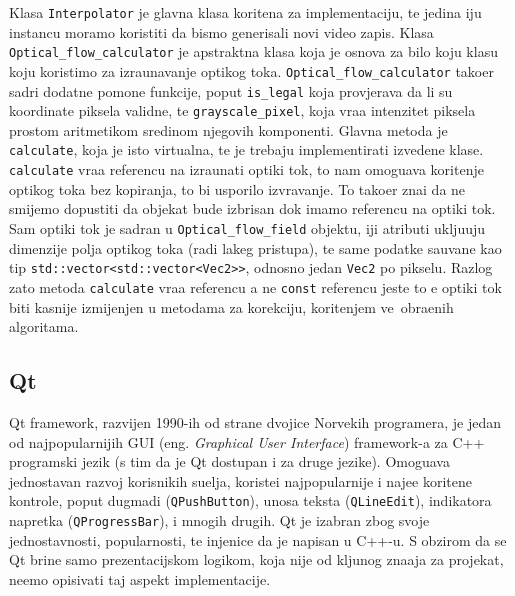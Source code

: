 Klasa \lstinline{Interpolator} je glavna klasa kori\sh tena za implementaciju, te jedina \ch iju instancu moramo koristiti da bismo generisali novi video zapis. Klasa \lstinline{Optical_flow_calculator}
je apstraktna klasa koja je osnova za bilo koju klasu koju koristimo za izra\ch unavanje opti\ch kog toka. \lstinline{Optical_flow_calculator} tako\dj er sadr\zh i dodatne pomo\cj ne funkcije, poput
\lstinline{is_legal} koja provjerava da li su koordinate piksela validne, te \lstinline{grayscale_pixel}, koja vra\cj a intenzitet piksela prostom aritmeti\ch kom sredinom njegovih komponenti.
Glavna metoda je \lstinline{calculate}, koja je \ch isto virtualna, te je trebaju implementirati izvedene klase. \lstinline{calculate} vra\cj a referencu na izra\ch unati opti\ch ki tok, \sh to nam omogu\cj ava
kori\sh tenje opti\ch kog toka bez kopiranja, \sh to bi usporilo izvr\sh avanje. To tako\dj er zna\ch i da ne smijemo dopustiti da objekat bude izbrisan dok imamo referencu na opti\ch ki tok.
Sam opti\ch ki tok je sadr\zh an u \lstinline{Optical_flow_field} objektu, \ch iji atributi uklju\ch uju dimenzije polja opti\ch kog toka (radi lak\sh eg pristupa), te same podatke sa\ch uvane kao tip
\lstinline{std::vector<std::vector<Vec2>>}, odnosno jedan \lstinline{Vec2} po pikselu. Razlog za\sh to metoda \lstinline{calculate} vra\cj a referencu a ne \lstinline{const} referencu jeste \sh to \cj e
opti\ch ki tok biti kasnije izmijenjen u metodama za korekciju, kori\sh tenjem ve\cj\ obra\dj enih algoritama.

\subsection{Qt} %
Qt framework, razvijen 1990-ih od strane dvojice Norve\sh kih programera, je jedan od najpopularnijih GUI (eng. \textit{Graphical User Interface}) framework-a za C++ programski jezik (s tim da je
Qt dostupan i za druge jezike). Omogu\cj ava jednostavan razvoj korisni\ch kih su\ch elja, koriste\cj i najpopularnije i naj\ch e\sh \cj e kori\sh tene kontrole, poput dugmadi (\lstinline{QPushButton}),
unosa teksta (\lstinline{QLineEdit}), indikatora napretka (\lstinline{QProgressBar}), i mnogih drugih. Qt je izabran zbog svoje jednostavnosti, popularnosti, te \ch injenice da je napisan u C++-u.
S obzirom da se Qt brine samo prezentacijskom logikom, koja nije od klju\ch nog zna\ch aja za projekat, ne\cj emo opisivati taj aspekt implementacije.